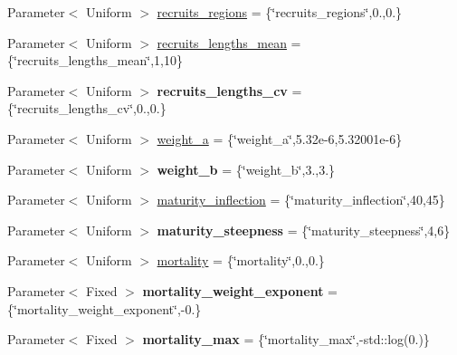 \begin{DoxyCompactItemize}
\item 
Parameter$<$ Uniform $>$ \hyperlink{classIOSKJ_1_1Parameters_a9631eb719ef2cb669a3214d3377be1d8}{recruits\-\_\-regions} = \{\char`\"{}recruits\-\_\-regions\char`\"{},0.,0.\}
\item 
Parameter$<$ Uniform $>$ \hyperlink{classIOSKJ_1_1Parameters_acb9ab0f89f7ceec2e8301862f0f594ec}{recruits\-\_\-lengths\-\_\-mean} = \{\char`\"{}recruits\-\_\-lengths\-\_\-mean\char`\"{},1,10\}
\item 
\hypertarget{classIOSKJ_1_1Parameters_a6004f0a5f55c0854ca825e14d3c8f051}{Parameter$<$ Uniform $>$ {\bfseries recruits\-\_\-lengths\-\_\-cv} = \{\char`\"{}recruits\-\_\-lengths\-\_\-cv\char`\"{},0.,0.\}}\label{classIOSKJ_1_1Parameters_a6004f0a5f55c0854ca825e14d3c8f051}

\item 
Parameter$<$ Uniform $>$ \hyperlink{classIOSKJ_1_1Parameters_a522571c48a9b3e5c82315da4f3498865}{weight\-\_\-a} = \{\char`\"{}weight\-\_\-a\char`\"{},5.\-32e-\/6,5.\-32001e-\/6\}
\item 
\hypertarget{classIOSKJ_1_1Parameters_ad0ce26cf117948f8dfe48339523dae48}{Parameter$<$ Uniform $>$ {\bfseries weight\-\_\-b} = \{\char`\"{}weight\-\_\-b\char`\"{},3.,3.\}}\label{classIOSKJ_1_1Parameters_ad0ce26cf117948f8dfe48339523dae48}

\item 
Parameter$<$ Uniform $>$ \hyperlink{classIOSKJ_1_1Parameters_a29585748679da64389d2ba756da72c99}{maturity\-\_\-inflection} = \{\char`\"{}maturity\-\_\-inflection\char`\"{},40,45\}
\item 
\hypertarget{classIOSKJ_1_1Parameters_a9c3a9534cfe6168f3e8acafe118e3945}{Parameter$<$ Uniform $>$ {\bfseries maturity\-\_\-steepness} = \{\char`\"{}maturity\-\_\-steepness\char`\"{},4,6\}}\label{classIOSKJ_1_1Parameters_a9c3a9534cfe6168f3e8acafe118e3945}

\item 
Parameter$<$ Uniform $>$ \hyperlink{classIOSKJ_1_1Parameters_a3f7804d8ec305804a0a697abcb1b0042}{mortality} = \{\char`\"{}mortality\char`\"{},0.,0.\}
\item 
\hypertarget{classIOSKJ_1_1Parameters_a17b1018f35ffc5618c31955668c5c46c}{Parameter$<$ Fixed $>$ {\bfseries mortality\-\_\-weight\-\_\-exponent} = \{\char`\"{}mortality\-\_\-weight\-\_\-exponent\char`\"{},-\/0.\}}\label{classIOSKJ_1_1Parameters_a17b1018f35ffc5618c31955668c5c46c}

\item 
\hypertarget{classIOSKJ_1_1Parameters_a538b748c58649f18afc76da1548f236f}{Parameter$<$ Fixed $>$ {\bfseries mortality\-\_\-max} = \{\char`\"{}mortality\-\_\-max\char`\"{},-\/std\-::log(0.)\}}\label{classIOSKJ_1_1Parameters_a538b748c58649f18afc76da1548f236f}


\end{DoxyCompactItemize}
